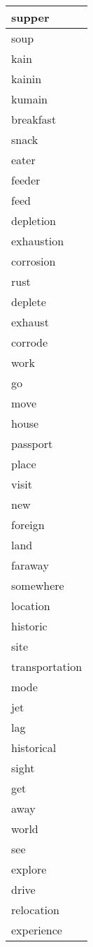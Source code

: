 \begin{longtable}{|p{3cm}|}
supper \\ \hline
soup \\ \hline
kain \\ \hline
kainin \\ \hline
kumain \\ \hline
breakfast \\ \hline
snack \\ \hline
eater \\ \hline
feeder \\ \hline
feed \\ \hline
depletion \\ \hline
exhaustion \\ \hline
corrosion \\ \hline
rust \\ \hline
deplete \\ \hline
exhaust \\ \hline
corrode \\ \hline
work \\ \hline
go \\ \hline
move \\ \hline
house \\ \hline
passport \\ \hline
place \\ \hline
visit \\ \hline
new \\ \hline
foreign \\ \hline
land \\ \hline
faraway \\ \hline
somewhere \\ \hline
location \\ \hline
historic \\ \hline
site \\ \hline
transportation \\ \hline
mode \\ \hline
jet \\ \hline
lag \\ \hline
historical \\ \hline
sight \\ \hline
get \\ \hline
away \\ \hline
world \\ \hline
see \\ \hline
explore \\ \hline
drive \\ \hline
relocation \\ \hline
experience \\ \hline

\end{longtable}
